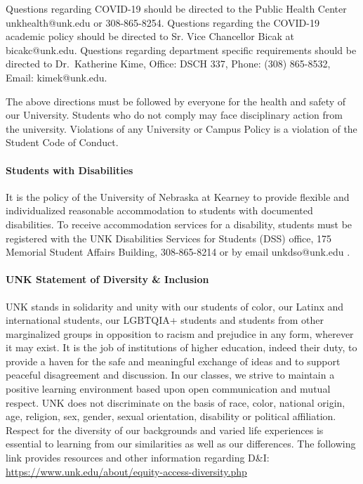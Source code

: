 \documentclass[12pt]{article}
\newcounter{ex}\setcounter{ex}{0}
\newcounter{cy}\setcounter{cy}{\the\year}
\begin{document}
Questions regarding COVID-19 should be directed to the Public Health Center unkhealth@unk.edu or 308-865-8254. Questions regarding the COVID-19 academic policy should be directed to Sr. Vice Chancellor Bicak at bicakc@unk.edu. Questions regarding department specific requirements should be directed to Dr.\ Katherine Kime,  Office: DSCH 337, Phone: (308) 865-8532,  Email: kimek@unk.edu.

The above directions must be followed by everyone for the health and safety of our University. Students who do not comply may face disciplinary action from the university. Violations of any University or Campus Policy is a violation of the Student Code of Conduct.




\paragraph{Students with Disabilities} It is the policy of the University of Nebraska at Kearney to provide flexible and individualized reasonable accommodation to students with documented disabilities. To receive accommodation services for a disability, students must be registered with the UNK Disabilities Services for Students (DSS) office, 175 Memorial Student Affairs Building, 308-865-8214 or by email unkdso@unk.edu .



\paragraph{UNK Statement of Diversity \& Inclusion} UNK stands in solidarity and unity with our students of color, our Latinx and international students, our LGBTQIA+ students and students from other marginalized groups in opposition to racism and prejudice in any form, wherever it may exist. It is the job of institutions of higher education, indeed their duty, to provide a haven for the safe and meaningful exchange of ideas and to support peaceful disagreement and discussion. In our classes, we strive to maintain a positive learning environment based upon open communication and mutual respect. UNK does not discriminate on the basis of race, color, national origin, age, religion, sex, gender, sexual orientation, disability or political affiliation. Respect for the diversity of our backgrounds and varied life experiences is essential to learning from our similarities as well as our differences. The following link provides resources and other information regarding D\&I: \url{https://www.unk.edu/about/equity-access-diversity.php}
\end{document}
